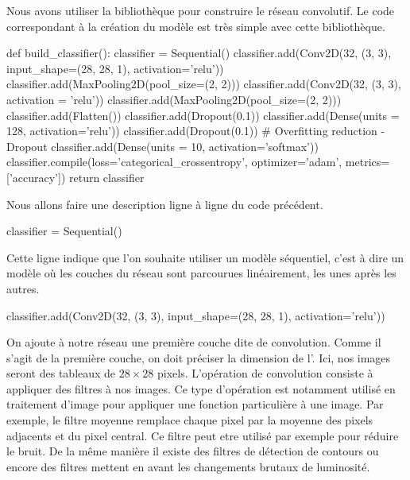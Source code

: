 Nous avons utiliser la bibliothèque \Python {} pour construire 
le réseau convolutif. 
Le code correspondant à la création du modèle est très simple avec cette 
bibliothèque.

\begin{codeblock}
def build_classifier():
    classifier = Sequential()
    classifier.add(Conv2D(32, (3, 3), input_shape=(28, 28, 1), activation='relu'))
    classifier.add(MaxPooling2D(pool_size=(2, 2)))
    classifier.add(Conv2D(32, (3, 3), activation = 'relu'))
    classifier.add(MaxPooling2D(pool_size=(2, 2)))
    classifier.add(Flatten())
    classifier.add(Dropout(0.1)) 
    classifier.add(Dense(units = 128, activation='relu'))
    classifier.add(Dropout(0.1)) # Overfitting reduction - Dropout
    classifier.add(Dense(units = 10, activation='softmax'))
    classifier.compile(loss='categorical_crossentropy', optimizer='adam', metrics=['accuracy'])
    return classifier
\end{codeblock}

Nous allons faire une description ligne à ligne du code précédent.

\begin{codeblock}
classifier = Sequential()
\end{codeblock}

Cette ligne indique que l'on souhaite utiliser un modèle séquentiel, 
c'est à dire un modèle où les couches du réseau sont parcourues linéairement, 
les unes après les autres.

\begin{codeblock}
classifier.add(Conv2D(32, (3, 3), input_shape=(28, 28, 1), activation='relu'))
\end{codeblock}

On ajoute à notre réseau une première couche dite de convolution. 
Comme il s'agit de la première couche, on doit préciser la dimension de 
l'. 
Ici, nos images seront des tableaux de $28 \times 28$ pixels.  
L'opération de convolution consiste à appliquer des filtres à nos images. Ce type 
d'opération est notamment utilisé en traitement d'image pour appliquer une fonction
particulière à une image. Par exemple, le filtre moyenne remplace chaque pixel par la 
moyenne des pixels adjacents et du pixel central. Ce filtre peut etre utilisé par
exemple pour réduire le bruit. De la même manière il existe des filtres de détection de 
contours ou encore des filtres mettent en avant les changements brutaux de luminosité.

